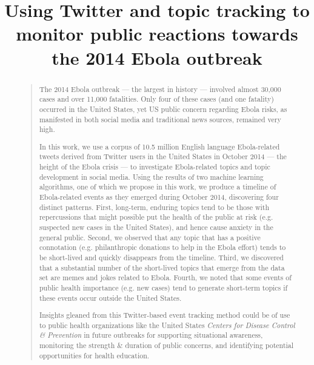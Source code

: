 \documentclass[letterpaper]{article}
\title{Using Twitter and topic tracking to monitor public reactions
  towards  the 2014 Ebola outbreak}
\begin{document}
\maketitle

\begin{abstract}
\begin{quote}
The 2014 Ebola outbreak --- the largest in history --- involved almost 
30,000 cases and over 11,000 fatalities.  
Only four of these cases (and one fatality) occurred in the 
United States, yet US public concern regarding Ebola risks, 
as manifested in both social media and traditional news sources, 
remained very high.

In this work, we use a corpus of 10.5 million English 
language Ebola-related tweets derived from Twitter users in 
the United States in October 2014 --- the height of the 
Ebola crisis --- to investigate Ebola-related topics and topic 
development in social media.  Using the results of two machine 
learning algorithms, one of which we propose in this work, 
we produce a timeline of Ebola-related events as they emerged 
during October 2014, discovering four distinct patterns.   First, long-term, enduring topics tend to be those with repercussions
that might possible put the health of the public at risk
(e.g. suspected new cases in the United States), and hence cause
anxiety in the general public.  Second, we observed
that any topic that has a positive connotation (e.g. philanthropic
donations to help in the Ebola effort) tends to be short-lived and
quickly disappears from the timeline.   Third, we discovered that a
substantial number of the  short-lived topics that emerge from the data set  are
memes and jokes related to Ebola.  Fourth,  we noted that some events
of public health importance (e.g. new cases) tend to generate
short-term topics if these events occur outside the United States.

 Insights gleaned from this 
Twitter-based event tracking method could be of use to
public health organizations like the United States \emph{Centers 
for Disease Control \& Prevention} in future outbreaks for supporting situational 
awareness, monitoring the strength \& duration of public concerns, 
and identifying potential opportunities for health education.


\end{quote}
\end{abstract}  
\end{document}
